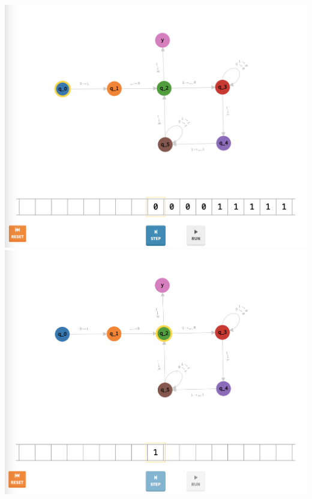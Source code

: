 \documentclass[a4paper]{article}
\begin{document}
\begin{center}
\includegraphics[width=\textwidth]{TM1.7}
\includegraphics[width=\textwidth]{TM1.8}
\end{center}
\newpage
\end{document}

